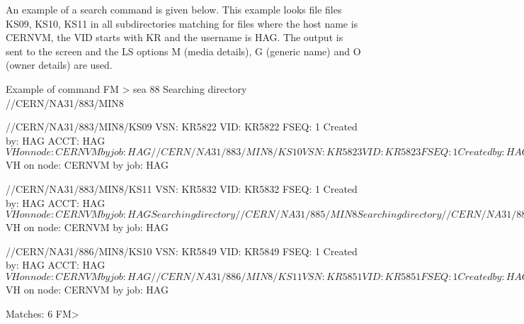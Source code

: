 An example of a search command is given below. This example
looks file files KS09, KS10, KS11 in all subdirectories
matching  for files where the host name is CERNVM, the
VID starts with KR and the username is HAG. The output is sent
to the screen and the LS options M (media details), G (generic name)
and O (owner details) are used.
\begin{XMPt}{Example of \protect{} command}
 FM > sea 88%
 Searching directory //CERN/NA31/883/MIN8
 
 //CERN/NA31/883/MIN8/KS09
 VSN: KR5822 VID: KR5822 FSEQ:    1
 Created by:  HAG      ACCT: HAG$VH   on node: CERNVM   by job: HAG
 
 //CERN/NA31/883/MIN8/KS10
 VSN: KR5823 VID: KR5823 FSEQ:    1
 Created by:  HAG      ACCT: HAG$VH   on node: CERNVM   by job: HAG
 
 //CERN/NA31/883/MIN8/KS11
 VSN: KR5832 VID: KR5832 FSEQ:    1
 Created by:  HAG      ACCT: HAG$VH   on node: CERNVM   by job: HAG
 Searching directory //CERN/NA31/885/MIN8
 Searching directory //CERN/NA31/886/MIN8
 
 //CERN/NA31/886/MIN8/KS09
 VSN: KR5847 VID: KR5847 FSEQ:    1
 Created by:  HAG      ACCT: HAG$VH   on node: CERNVM   by job: HAG
 
 //CERN/NA31/886/MIN8/KS10
 VSN: KR5849 VID: KR5849 FSEQ:    1
 Created by:  HAG      ACCT: HAG$VH   on node: CERNVM   by job: HAG
 
 //CERN/NA31/886/MIN8/KS11
 VSN: KR5851 VID: KR5851 FSEQ:    1
 Created by:  HAG      ACCT: HAG$VH   on node: CERNVM   by job: HAG
 
 Matches:    6
 FM>
\end{XMPt}
 
